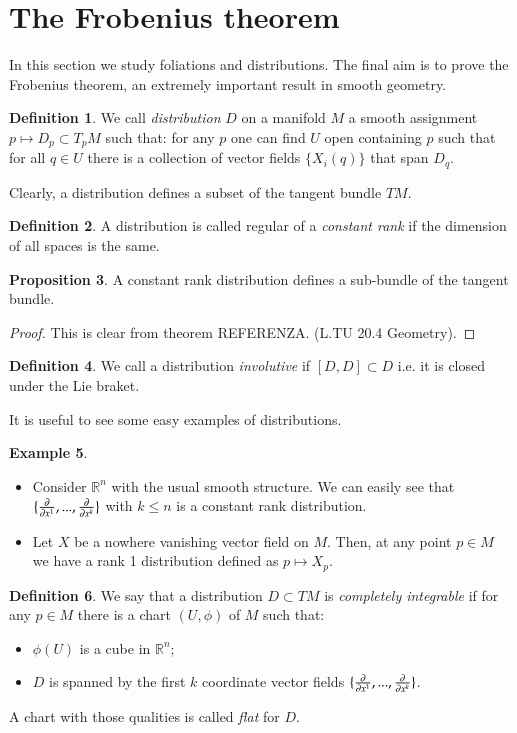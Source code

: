 \documentclass[12pt,a4paper]{report}
\theoremstyle{definition}
\newtheorem{Def}{Definition}[chapter]
\theoremstyle{Theorem}
\newtheorem{Prop}[Def]{Proposition}
\theoremstyle{break}
\newtheorem{Ex}[Def]{Example}
\theoremstyle{definition}
\begin{document}
		\section{The Frobenius theorem}
		In this section we study foliations and distributions. The final aim is to prove the Frobenius theorem, an extremely important result in smooth geometry.
		\begin{Def}
			We call \textit{distribution} $D$ on a manifold $M$ a smooth assignment $p\mapsto D_p\subset T_pM$ such that: for any $p$ one can find $U$ open containing $p$ such that for all $q\in U$ there is a collection of vector fields $\{X_i(q)\}$ that span $D_q$.
		\end{Def}
		Clearly, a distribution defines a subset of the tangent bundle $TM$.
		\begin{Def}
			A distribution is called regular of a \textit{constant rank} if the dimension of all spaces is the same. 
		\end{Def}
		\begin{Prop}
			A constant rank distribution defines a sub-bundle of the tangent bundle.
		\end{Prop}
		\begin{proof}
			This is clear from theorem REFERENZA. (L.TU 20.4 Geometry).
		\end{proof}
		\begin{Def}
			We call a distribution \textit{involutive} if $[D,D]\subset D$ i.e. it is closed under the Lie braket.
		\end{Def}
		It is useful to see some easy examples of distributions.
		\begin{Ex}
			\begin{itemize}
				\item Consider $\mathbb{R}^n$ with the usual smooth structure. We can easily see that $\{{\partial\over \partial x^1},...,{\partial\over \partial x^k}\}$ with $k\leq n$ is a constant rank distribution.
				\item Let $X$ be a nowhere vanishing vector field on $M$. Then, at any point $p\in M$ we have a rank 1 distribution defined as $p\mapsto X_p$.
			\end{itemize}
		\end{Ex}
		\begin{Def}
			We say that a distribution $D\subset TM$ is \textit{completely integrable} if for any $p\in M$ there is a chart $(U,\phi)$ of $M$ such that:
			\begin{itemize}
				\item $\phi(U)$ is a cube in $\mathbb{R}^n$;
				\item $D$ is spanned by the first $k$ coordinate vector fields $\{{\partial\over \partial x^1},...,{\partial\over \partial x^k}\}$.
			\end{itemize}
			A chart with those qualities is called \textit{flat} for $D$.
 		\end{Def}
\end{document}
